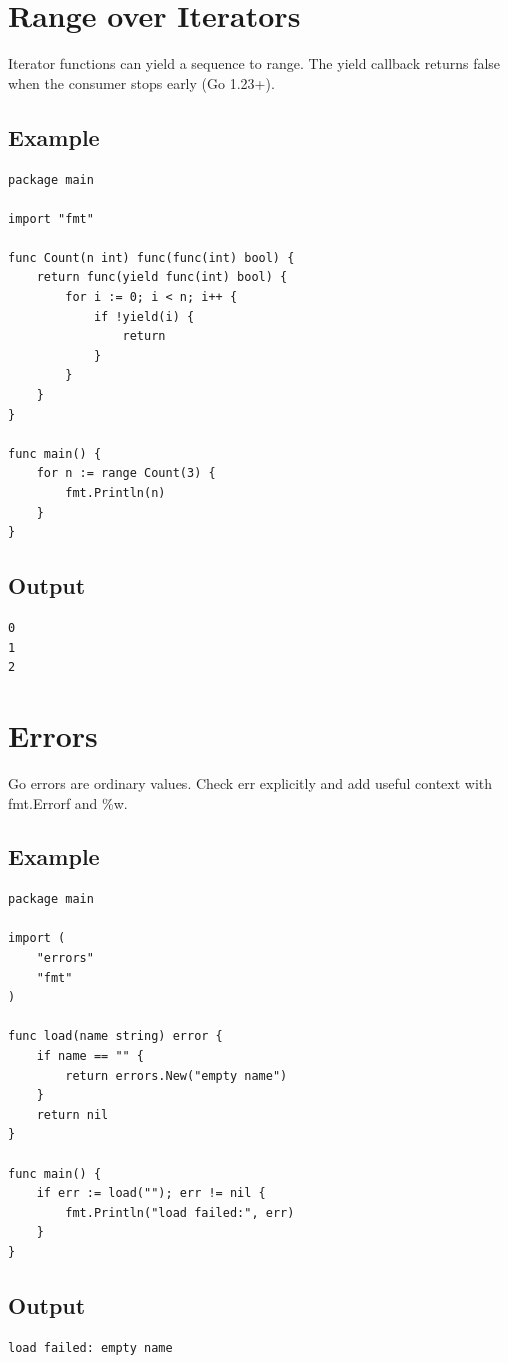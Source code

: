 \documentclass[10pt,oneside]{article}
\newcommand{\sectionline}{\par\vspace{4pt}{\color{rule}\hrule height .5pt}\vspace{7pt}\color{ink}\noindent}
\begin{document}
\section{Range over Iterators}
\sectionline
Iterator functions can yield a sequence to range. The yield callback returns false when the consumer stops early (Go 1.23+).\par
\subsection*{Example}
\begin{lstlisting}[style=gocode]
package main

import "fmt"

func Count(n int) func(func(int) bool) {
	return func(yield func(int) bool) {
		for i := 0; i < n; i++ {
			if !yield(i) {
				return
			}
		}
	}
}

func main() {
	for n := range Count(3) {
		fmt.Println(n)
	}
}
\end{lstlisting}
\subsection*{Output}
\begin{lstlisting}[style=terminal]
0
1
2
\end{lstlisting}
\clearpage
\section{Errors}
\sectionline
Go errors are ordinary values. Check err explicitly and add useful context with fmt.Errorf and \%w.\par
\subsection*{Example}
\begin{lstlisting}[style=gocode]
package main

import (
	"errors"
	"fmt"
)

func load(name string) error {
	if name == "" {
		return errors.New("empty name")
	}
	return nil
}

func main() {
	if err := load(""); err != nil {
		fmt.Println("load failed:", err)
	}
}
\end{lstlisting}
\subsection*{Output}
\begin{lstlisting}[style=terminal]
load failed: empty name
\end{lstlisting}
\clearpage
\end{document}
